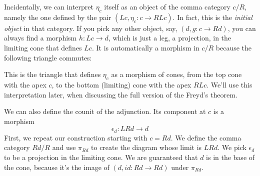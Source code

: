 \documentclass[11pt]{amsart}
\begin{document}
\begin{figure}[H]
\end{figure}



Incidentally, we can interpret $\eta_c$ itself as an object of the comma category $c/R$, namely the one defined by the pair $(Lc, \eta_c \colon c \to R L c)$. In fact, this is the \emph{initial object} in that category. If you pick any other object, say, $(d, g \colon c \to R d)$, you can always find a morphism $h \colon L c \to d$, which is just a leg, a projection, in the limiting cone that defines $L c$. It is automatically a morphism in $c/R$ because the following triangle commutes:

\begin{figure}[H]
\centering
\end{figure}
This is the triangle that defines $\eta_c$ as a morphism of cones, from the top cone with the apex $c$, to the bottom (limiting) cone with the apex $R L c$. We'll use this interpretation later, when discussing the full version of the Freyd's theorem.

We can also define the counit of the adjunction. Its component at $c$ is a morphism
\[\epsilon_d : L R d \to d \]
First, we repeat our construction starting with $c = R d$. We define the comma category $R d / R$ and use $\pi_{R d}$ to create the diagram whose limit is $L R d$. We pick $\epsilon_d$ to be a projection in the limiting cone. We are guaranteed that $d$ is in the base of the cone, because it's the image of $(d, id \colon R d \to R d)$ under $\pi_{R d}$. 
\end{document}
